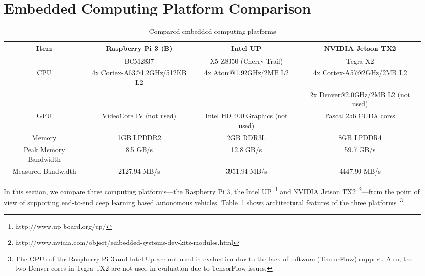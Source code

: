 
%

\section{Embedded Computing Platform Comparison}\label{sec:comparison}


\begin{table}[h]
  \centering
  \begin{adjustbox}{width=1\textwidth}
  \begin{tabular}{|c|c|c|c|}
    \hline
    Item    & Raspberry Pi 3 (B)   & Intel UP                  & NVIDIA Jetson TX2\\
    \hline
            & BCM2837              & X5-Z8350 (Cherry Trail)   & Tegra X2 \\
    CPU     & 4x Cortex-A53@1.2GHz/512KB L2  &
              4x Atom@1.92GHz/2MB L2 &
              4x Cortex-A57@2GHz/2MB L2 \\
            &              &              & 2x Denver@2.0GHz/2MB L2 (not used)  \\
    \hline
    GPU     &  VideoCore IV (not used)    &
               Intel HD 400 Graphics (not used) &
               Pascal 256 CUDA cores   \\
    \hline
    Memory  & 1GB LPDDR2   &  2GB DDR3L     & 8GB LPDDR4              \\
    \hline
	Peak Memory Bandwidth & 8.5 GB/s & 12.8 GB/s & 59.7 GB/s \\
	\hline
	Measured Bandwidth & 2127.94 MB/s & 3951.94 MB/s & 4447.90 MB/s \\
	\hline
  \end{tabular}
  \end{adjustbox}
  \caption{Compared embedded computing platforms}
  \label{tbl:platforms}
\end{table}

In this section, we compare three computing platforms---the Raspberry
Pi 3, the Intel UP~\footnote{http://www.up-board.org/up/} and NVIDIA
Jetson
TX2~\footnote{http://www.nvidia.com/object/embedded-systems-dev-kits-modules.html}---from
the point of view of supporting end-to-end deep learning
based autonomous vehicles. 
Table~\ref{tbl:platforms} shows architectural features of the three
platforms~\footnote{The GPUs of the Raspberry Pi 3 and Intel
  Up are not used in evaluation due to the lack of software (TensorFlow)
support. Also, the two Denver cores in Tegra TX2 are not used in
evaluation due to TensorFlow issues.}.
  
